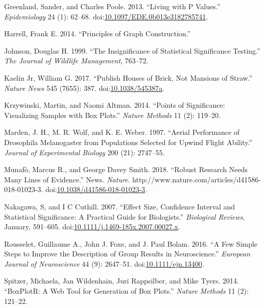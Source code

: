\documentclass[]{article}
\theoremstyle{definition}
\theoremstyle{definition}
\theoremstyle{definition}
\theoremstyle{remark}
\begin{document}
\hypertarget{ref-Greenland_Living_2013}{}
Greenland, Sander, and Charles Poole. 2013. ``Living with P Values.''
\emph{Epidemiology} 24 (1): 62--68.
doi:\href{https://doi.org/10.1097/EDE.0b013e3182785741}{10.1097/EDE.0b013e3182785741}.

\hypertarget{ref-Harrell_Principles_2014}{}
Harrell, Frank E. 2014. ``Principles of Graph Construction.''

\hypertarget{ref-Johnson_insignificance_1999}{}
Johnson, Douglas H. 1999. ``The Insignificance of Statistical
Significance Testing.'' \emph{The Journal of Wildlife Management},
763--72.

\hypertarget{ref-KaelinJr_Publish_2017}{}
Kaelin Jr, William G. 2017. ``Publish Houses of Brick, Not Mansions of
Straw.'' \emph{Nature News} 545 (7655): 387.
doi:\href{https://doi.org/10.1038/545387a}{10.1038/545387a}.

\hypertarget{ref-Krzywinski_Points_2014}{}
Krzywinski, Martin, and Naomi Altman. 2014. ``Points of Significance:
Visualizing Samples with Box Plots.'' \emph{Nature Methods} 11 (2):
119--20.

\hypertarget{ref-Marden_Aerial_1997}{}
Marden, J. H., M. R. Wolf, and K. E. Weber. 1997. ``Aerial Performance
of Drosophila Melanogaster from Populations Selected for Upwind Flight
Ability.'' \emph{Journal of Experimental Biology} 200 (21): 2747--55.

\hypertarget{ref-Munafo_Robust_2018}{}
Munafò, Marcus R., and George Davey Smith. 2018. ``Robust Research Needs
Many Lines of Evidence.'' News. \emph{Nature}.
http://www.nature.com/articles/d41586-018-01023-3.
doi:\href{https://doi.org/10.1038/d41586-018-01023-3}{10.1038/d41586-018-01023-3}.

\hypertarget{ref-Nakagawa_Effect_2007}{}
Nakagawa, S, and I C Cuthill. 2007. ``Effect Size, Confidence Interval
and Statistical Significance: A Practical Guide for Biologists.''
\emph{Biological Reviews}, January, 591--605.
doi:\href{https://doi.org/10.1111/j.1469-185x.2007.00027.x}{10.1111/j.1469-185x.2007.00027.x}.

\hypertarget{ref-Rousselet_few_2016}{}
Rousselet, Guillaume A., John J. Foxe, and J. Paul Bolam. 2016. ``A Few
Simple Steps to Improve the Description of Group Results in
Neuroscience.'' \emph{European Journal of Neuroscience} 44 (9):
2647--51.
doi:\href{https://doi.org/10.1111/ejn.13400}{10.1111/ejn.13400}.

\newpage

\hypertarget{ref-Spitzer_BoxPlotR_2014}{}
Spitzer, Michaela, Jan Wildenhain, Juri Rappsilber, and Mike Tyers.
2014. ``BoxPlotR: A Web Tool for Generation of Box Plots.'' \emph{Nature
Methods} 11 (2): 121--22.
\end{document}
